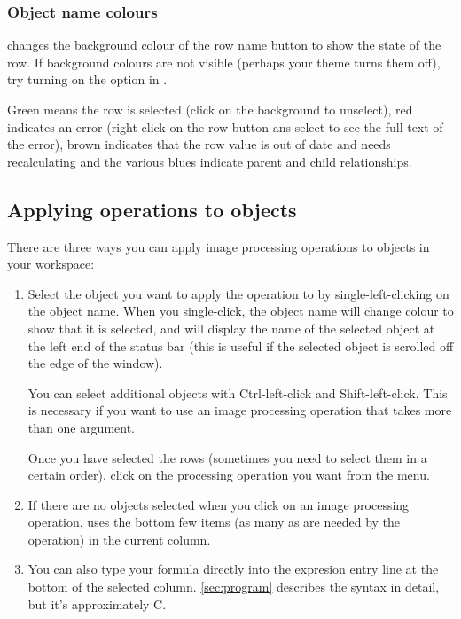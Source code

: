 \subsubsection{Object name colours}

\nip{} changes the background colour of the row name button to show the state
of the row. If background colours are not visible (perhaps your theme turns
them off), try turning on the  option in
.

Green means the row is selected (click on the background to unselect), red
indicates an error (right-click on the row button ans select 
to see the full text of the error), brown indicates that the row value is out 
of date and needs recalculating and the various blues indicate parent and
child relationships.

\subsection{Applying operations to objects}

There are three ways you can apply image processing operations to objects
in your workspace:

\begin{enumerate}

\item
Select the object you want to apply the operation to by single-left-clicking
on the object name. When you single-click, the object name will change
colour to show that it is selected, and \nip{} will display the name of
the selected object at the left end of the status bar (this is
useful if the selected object is scrolled off the edge of the window).

You can select additional objects with Ctrl-left-click and
Shift-left-click. This is necessary if you want to use an image
processing operation that takes more than one argument.

Once you have selected the rows (sometimes you need to select them in a
certain order), click on the
processing operation you want from the  menu.

\item
If there are no objects selected when you click on an image processing
operation, \nip{} uses the bottom few items (as many as are needed by the
operation) in the current column. 

\item
You can also type your formula directly into the expresion
entry line at the bottom of the selected column. \cref{sec:program} describes
the syntax in detail, but it's approximately C.

\end{enumerate}

